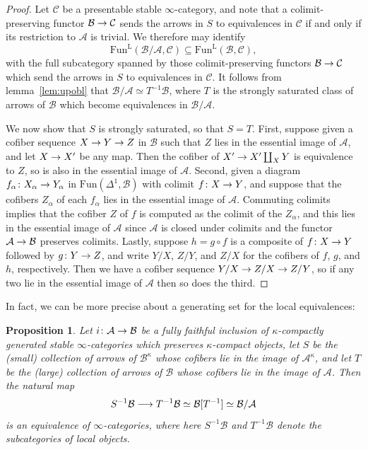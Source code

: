 \documentclass{amsart}
\newcommand{\htp}{\simeq}
\renewcommand{\to}{\mathchoice{\longrightarrow}{\rightarrow}{\rightarrow}{\rightarrow}}
\let\catsymbfont\mathcal
\newcommand{\aA}{{\catsymbfont{A}}}
\newcommand{\aB}{{\catsymbfont{B}}}
\newcommand{\aC}{{\catsymbfont{C}}}
\renewcommand{\L}{\mathrm{L}}
\newcommand{\Fun}{\mathrm{Fun}} %
\renewcommand{\i}{\infty}
\numberwithin{equation}{section}
\newtheorem{proposition}[equation]{Proposition}
\theoremstyle{definition}
\begin{document}
\begin{proof}
Let $\aC$ be a presentable stable $\i$-category, and note that a
colimit-preserving functor $\aB\to\aC$ sends the arrows in $S$ to
equivalences in $\aC$ if and only if its restriction to $\aA$ is
trivial. 
We therefore may identify
\[
\Fun^{\L}(\aB/\aA,\aC)\subseteq\Fun^{\L}(\aB,\aC),
\]
with the full subcategory spanned by those colimit-preserving functors
$\aB\to\aC$ which send the arrows in $S$ to equivalences in $\aC$.  It
follows from lemma~\ref{lem:upobl} that $\aB/\aA\simeq
T^{-1}\aB$, where $T$ is the strongly saturated class of arrows of
$\aB$ which become equivalences in $\aB/\aA$.

We now show that $S$ is strongly saturated, so that $S=T$.  First,
suppose given a cofiber sequence $X\to Y\to Z$ in $\aB$ such that $Z$
lies in the essential image of $\aA$, and let $X\to X'$ be any map.
Then the cofiber of $X'\to X'\coprod_X Y$ is equivalence to $Z$, so is
also in the essential image of $\aA$.  Second, given a diagram
$f_\alpha\colon X_\alpha\to Y_\alpha$ in $\Fun(\Delta^1,\aB)$ with
colimit $f\colon X\to Y$, and suppose that the cofibers $Z_\alpha$ of
each $f_\alpha$ lies in the essential image of $\aA$.  Commuting
colimits implies that the cofiber $Z$ of $f$ is computed as the
colimit of the $Z_\alpha$, and this lies in the essential image of
$\aA$ since $\aA$ is closed under colimits and the functor $\aA\to\aB$
preserves colimits.  Lastly, suppose $h=g\circ f$ is a composite of
$f\colon X\to Y$ followed by $g\colon Y\to Z$, and write $Y/X$, $Z/Y$,
and $Z/X$ for the cofibers of $f$, $g$, and $h$, respectively.  Then
we have a cofiber sequence $Y/X\to Z/X\to Z/Y$, so if any two lie in
the essential image of $\aA$ then so does the third.
\end{proof}

In fact, we can be more precise about a generating set for the local
equivalences:

\begin{proposition}\label{prop:initialquotient}
Let $i\colon \aA\to\aB$ be a fully faithful inclusion of
$\kappa$-compactly generated stable $\i$-categories which preserves
$\kappa$-compact objects, let $S$ be the (small) collection of arrows
of $\aB^\kappa$ whose cofibers lie in the image of $\aA^\kappa$, and
let $T$ be the (large) collection of arrows of $\aB$ whose cofibers
lie in the image of $\aA$.  Then the natural map
\[
S^{-1}\aB\to T^{-1}\aB \htp \aB[T^{-1}] \htp \aB/\aA
\]
is an equivalence of $\i$-categories, where here $S^{-1}\aB$ and
$T^{-1} \aB$ denote the subcategories of local objects.
\end{proposition}
\end{document}

